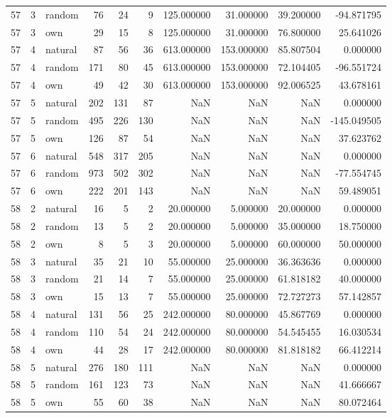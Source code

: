 \begin{table}[htbp]
\begin{tabular}{rrlrrrrrrr}
57 & 3 & random & 76 & 24 & 9 & 125.000000 & 31.000000 & 39.200000 & -94.871795 \\
57 & 3 & own & 29 & 15 & 8 & 125.000000 & 31.000000 & 76.800000 & 25.641026 \\
57 & 4 & natural & 87 & 56 & 36 & 613.000000 & 153.000000 & 85.807504 & 0.000000 \\
57 & 4 & random & 171 & 80 & 45 & 613.000000 & 153.000000 & 72.104405 & -96.551724 \\
57 & 4 & own & 49 & 42 & 30 & 613.000000 & 153.000000 & 92.006525 & 43.678161 \\
57 & 5 & natural & 202 & 131 & 87 & NaN & NaN & NaN & 0.000000 \\
57 & 5 & random & 495 & 226 & 130 & NaN & NaN & NaN & -145.049505 \\
57 & 5 & own & 126 & 87 & 54 & NaN & NaN & NaN & 37.623762 \\
57 & 6 & natural & 548 & 317 & 205 & NaN & NaN & NaN & 0.000000 \\
57 & 6 & random & 973 & 502 & 302 & NaN & NaN & NaN & -77.554745 \\
57 & 6 & own & 222 & 201 & 143 & NaN & NaN & NaN & 59.489051 \\
58 & 2 & natural & 16 & 5 & 2 & 20.000000 & 5.000000 & 20.000000 & 0.000000 \\
58 & 2 & random & 13 & 5 & 2 & 20.000000 & 5.000000 & 35.000000 & 18.750000 \\
58 & 2 & own & 8 & 5 & 3 & 20.000000 & 5.000000 & 60.000000 & 50.000000 \\
58 & 3 & natural & 35 & 21 & 10 & 55.000000 & 25.000000 & 36.363636 & 0.000000 \\
58 & 3 & random & 21 & 14 & 7 & 55.000000 & 25.000000 & 61.818182 & 40.000000 \\
58 & 3 & own & 15 & 13 & 7 & 55.000000 & 25.000000 & 72.727273 & 57.142857 \\
58 & 4 & natural & 131 & 56 & 25 & 242.000000 & 80.000000 & 45.867769 & 0.000000 \\
58 & 4 & random & 110 & 54 & 24 & 242.000000 & 80.000000 & 54.545455 & 16.030534 \\
58 & 4 & own & 44 & 28 & 17 & 242.000000 & 80.000000 & 81.818182 & 66.412214 \\
58 & 5 & natural & 276 & 180 & 111 & NaN & NaN & NaN & 0.000000 \\
58 & 5 & random & 161 & 123 & 73 & NaN & NaN & NaN & 41.666667 \\
58 & 5 & own & 55 & 60 & 38 & NaN & NaN & NaN & 80.072464 \\

\end{tabular}
\end{table}
